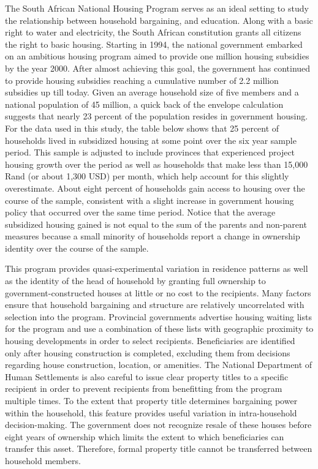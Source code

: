 \documentclass[11pt]{article} %
\begin{document}
The South African National Housing Program serves as an ideal setting to study the relationship between household bargaining, and education.  Along with a basic right to water and electricity, the South African constitution grants all citizens the right to basic housing.  Starting in 1994, the national government embarked on an ambitious housing program aimed to provide one million housing subsidies by the year 2000.  After almost achieving this goal, the government has continued to provide housing subsidies reaching a cumulative number of 2.2 million subsidies up till today.  Given an average household size of five members and a national population of 45 million, a quick back of the envelope calculation suggests that nearly 23 percent of the population resides in government housing.  For the data used in this study, the table below shows that 25 percent of households lived in subsidized housing at some point over the six year sample period.  This sample is adjusted to include provinces that experienced project housing growth over the period as well as households that make less than 15,000 Rand (or about 1,300 USD) per month, which help account for this slightly overestimate.  About eight percent of households gain access to housing over the course of the sample, consistent with a slight increase in government housing policy that occurred over the same time period.  Notice that the average subsidized housing gained is not equal to the sum of the parents and non-parent measures because a small minority of households report a change in ownership identity over the course of the sample.  

\hspace{1cm}

\begin{center}
	
\end {center}

This program provides quasi-experimental variation in residence patterns as well as the identity of the head of household by granting full ownership to government-constructed houses at little or no cost to the recipients.  Many factors ensure that household bargaining and structure are relatively uncorrelated with selection into the program.  Provincial governments advertise housing waiting lists for the program and use a combination of these lists with geographic proximity to housing developments in order to select recipients.  Beneficiaries are identified only after housing construction is completed, excluding them from decisions regarding house construction, location, or amenities.  The National Department of Human Settlements is also careful to issue clear property titles to a specific recipient in order to prevent recipients from benefitting from the program multiple times.  To the extent that property title determines bargaining power within the household, this feature provides useful variation in intra-household decision-making.  The government does not recognize resale of these houses before eight years of ownership which limits the extent to which beneficiaries can transfer this asset.  Therefore, formal property title cannot be transferred between household members.
\end{document}
